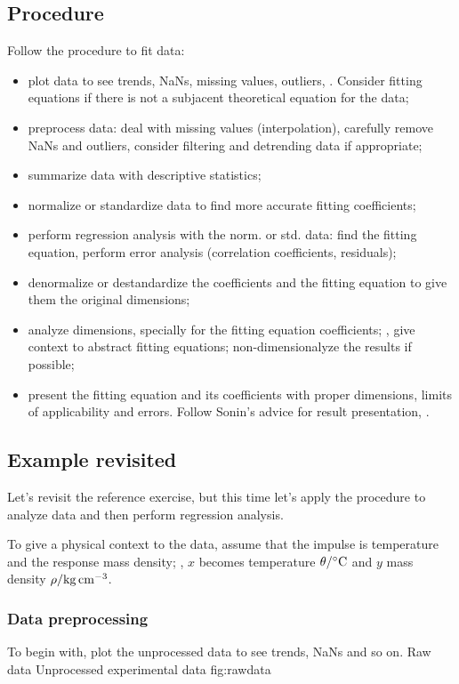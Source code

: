 \subsection*{Procedure}
%
Follow the procedure to fit data:
%
\begin{itemize}
%
\item plot data to see trends, NaNs, missing values, outliers, \etc. Consider fitting equations if there is not a subjacent theoretical equation for the data;
%
\item preprocess data: deal with missing values (interpolation), carefully remove NaNs and outliers, consider filtering and detrending data if appropriate;
%
\item summarize data with descriptive statistics;
%
\item normalize or standardize data to find more accurate fitting coefficients;
%
\item perform regression analysis with the norm. or std. data: find the fitting equation, perform error analysis (correlation coefficients, residuals);
%
\item denormalize or destandardize the coefficients and the fitting equation to give them the original dimensions;
%
\item analyze dimensions, specially for the fitting equation coefficients; \ie, give context to abstract fitting equations; non-dimensionalyze the results if possible;
%
\item present the fitting equation and its coefficients with proper dimensions, limits of applicability and errors. Follow Sonin's advice for result presentation, \cite[p. 23]{sonin:2001}.
%
\end{itemize}


\subsection*{Example revisited}
%
Let's revisit the reference exercise, but this time let's apply the procedure to analyze data and then perform regression analysis. 

To give a physical context to the data, assume that the impulse is temperature and the response mass density; \ie, $x$ becomes temperature $\temp/\si{\celsius}$ and $y$ mass density $\dens/\si{kg.cm^{-3}}$.


\subsubsection*{Data preprocessing}
%
To begin with, plot the unprocessed data to see trends, NaNs and so on.
%
%
   {Raw data}%
   {Unprocessed experimental data}%
   {fig:rawdata}%
%

